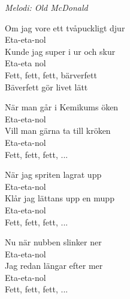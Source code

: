 {\footnotesize\textit{Melodi: Old McDonald}}\par
\vspace{10pt}
Om jag vore ett tvåpuckligt djur\\
Eta-eta-nol\\
Kunde jag super i ur och skur\\
Eta-eta nol\\
Fett, fett, fett, bärverfett\\
Bäverfett gör livet lätt\par
\vspace{10pt}
När man går i Kemikums öken\\
Eta-eta-nol\\
Vill man gärna ta till kröken\\
Eta-eta-nol\\
Fett, fett, fett, ...\par
\vspace{10pt}
När jag spriten lagrat upp\\
Eta-eta-nol\\
Klår jag lättans upp en mupp\\
Eta-eta-nol\\
Fett, fett, fett, ...\par
\vspace{10pt}
Nu när nubben slinker ner\\
Eta-eta-nol\\
Jag redan längar efter mer\\
Eta-eta-nol\\
Fett, fett, fett, ...

